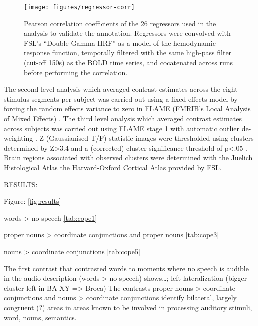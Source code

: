 \documentclass[10pt,a4paper,onecolumn]{article}
\begin{document}
\begin{figure*}
  \centering
  \texttt{[image: figures/regressor-corr]}
  \caption{Pearson correlation coefficients of the 26 regressors used in the analysis to validate the annotation.
Regressors were convolved with FSL's ``Double-Gamma HRF'' as a model of the hemodynamic response function, temporally filtered with the same high-pass filter (cut-off 150s) as the BOLD time series, and cocatenated across runs before performing the correlation.}
\label{fig:reg-corr}
\end{figure*}


The second-level analysis which averaged contrast estimates across the eight stimulus segments per subject was carried out using a fixed effects model by forcing the random effects variance to zero in FLAME (FMRIB’s Local Analysis of Mixed Effects) \citep{beckmann2003general, woolrich2004multilevel}.
The third level analysis which averaged contrast estimates across subjects was carried out using FLAME stage 1 with automatic outlier de-weighting \citep{beckmann2003general, woolrich2004multilevel, woolrich2008robust}.
Z (Gaussianised T/F) statistic images were thresholded using clusters determined by Z>3.4 and a (corrected) cluster significance threshold of p<.05 \citep{woolrich2008robust}.
Brain regions associated with observed clusters were determined with the Juelich Histological Atlas \citep{eickhoff2005toolbox,eickhoff2007assignment} the Harvard-Oxford Cortical Atlas \citep{desikan2006automated} provided by FSL.


RESULTS:

Figure: \ref{fig:results}

words > no-speech \ref{tab:cope1}

proper nouns > coordinate conjunctions and proper nouns \ref{tab:cope3}

nouns > coordinate conjunctions \ref{tab:cope5}

The first contrast that contrasted words to moments where no speech is audible in the audio-description (words > no-speech) shows\dots;
left lateralization (bigger cluster left in BA XY => Broca)
The contrasts proper nouns > coordinate conjunctions and nouns > coordinate conjunctions identify bilateral, largely congruent (?) areas in areas known to be involved in processing auditory stimuli, word, nouns, semantics.
\end{document}
